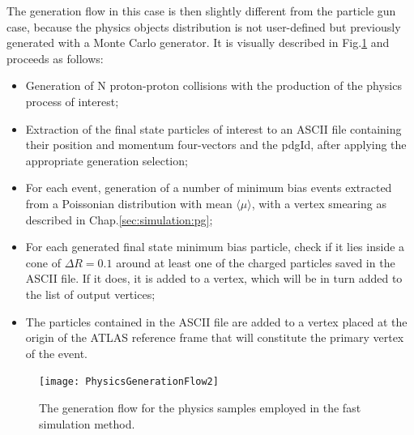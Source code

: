 \documentclass[a4paper,twoside,12pt]{book}
\begin{document}

The generation flow in this case is then slightly different from the particle gun case, because 
the physics objects distribution is not user-defined but previously generated with a Monte
Carlo generator. It is visually described in Fig.\ref{fig:PhysicsGenerationFlow} and proceeds as follows:\\

\begin{itemize}
\item Generation of N proton-proton collisions with the production of the physics process of
interest;
\item Extraction of the final state particles of interest to an ASCII file containing their
position and momentum four-vectors and the pdgId, after applying the appropriate generation selection;
\item For each event, generation of a number of minimum bias events extracted from a Poissonian distribution with mean $\langle\mu\rangle$, 
	with a vertex smearing as described in Chap.\ref{sec:simulation:pg};
\item For each generated final state minimum bias particle, check if it lies inside a cone of 
$\Delta R = 0.1$ around at least one of the charged particles saved in the ASCII file. If it does,
it is added to a vertex, which will be in turn added to the list of output vertices;
\item The particles contained in the ASCII file are added to a vertex placed at the origin
of the ATLAS reference frame that will constitute the primary vertex of the event.

\end{itemize}

\begin{figure} [h]
	\texttt{[image: PhysicsGenerationFlow2]}
	\caption{The generation flow for the physics samples employed in the fast 
	simulation method. }
	\label{fig:PhysicsGenerationFlow}
\end{figure}
\end{document}

